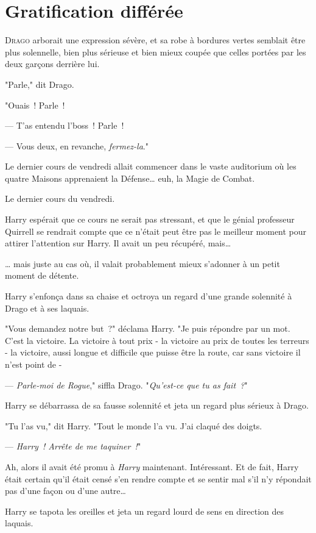 \chapter{Gratification différée}

\lettrine{D}{rago} arborait une expression sévère, et sa robe à bordures vertes semblait être plus solennelle, bien plus sérieuse et bien mieux coupée que celles portées par les deux garçons derrière lui.

"Parle," dit Drago.

"Ouais~! Parle~!

--- T'as entendu l'boss~! Parle~!

--- Vous deux, en revanche, \emph{fermez-la}."

Le dernier cours de vendredi allait commencer dans le vaste auditorium où les quatre Maisons apprenaient la Défense… euh, la Magie de Combat.

Le dernier cours du vendredi.

Harry espérait que ce cours ne serait pas stressant, et que le génial professeur Quirrell se rendrait compte que ce n'était peut être pas le meilleur moment pour attirer l'attention sur Harry. Il avait un peu récupéré, mais…

… mais juste au cas où, il valait probablement mieux s'adonner à un petit moment de détente.

Harry s'enfonça dans sa chaise et octroya un regard d'une grande solennité à Drago et à ses laquais.

"Vous demandez notre but~?" déclama Harry. "Je puis répondre par un mot. C'est la victoire. La victoire à tout prix - la victoire au prix de toutes les terreurs - la victoire, aussi longue et difficile que puisse être la route, car sans victoire il n'est point de -

--- \emph{Parle-moi de Rogue}," siffla Drago. "\emph{Qu'est-ce que tu as fait~?}"

Harry se débarrassa de sa fausse solennité et jeta un regard plus sérieux à Drago.

"Tu l'as vu," dit Harry. "Tout le monde l'a vu. J'ai claqué des doigts.

--- \emph{Harry~! Arrête de me taquiner~!}"

Ah, alors il avait été promu à \emph{Harry} maintenant. Intéressant. Et de fait, Harry était certain qu'il était censé s'en rendre compte et se sentir mal s'il n'y répondait pas d'une façon ou d'une autre…

Harry se tapota les oreilles et jeta un regard lourd de sens en direction des laquais.


